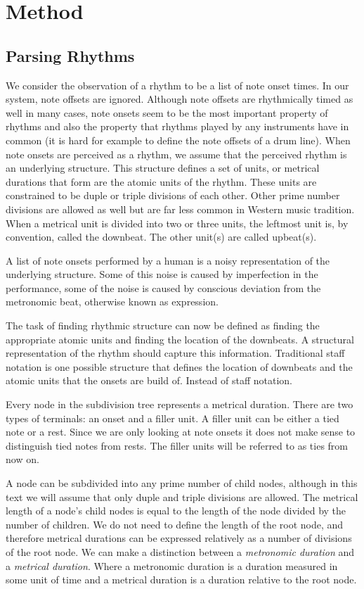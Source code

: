 \section{Method}
\label{sec:method}


\subsection{Parsing Rhythms}

We consider the observation of a rhythm to be a list of note onset times. In our system, note offsets are ignored. Although note offsets are rhythmically timed as well in many cases, note onsets seem to be the most important property of rhythms and also the property that rhythms played by any instruments have in common (it is hard for example to define the note offsets of a drum line). When note onsets are perceived as a rhythm, we assume that the perceived rhythm is an underlying structure. This structure defines a set of units, or metrical durations that form are the atomic units of the rhythm. These units are constrained to be duple or triple divisions of each other. Other prime number divisions are allowed as well but are far less common in Western music tradition. When a metrical unit is divided into two or three units, the leftmost unit is, by convention, called the downbeat. The other unit(s) are called upbeat(s).

A list of note onsets performed by a human is a noisy representation of the underlying structure. Some of this noise is caused by imperfection in the performance, some of the noise is caused by conscious deviation from the metronomic beat, otherwise known as expression.

The task of finding rhythmic structure can now be defined as finding the appropriate atomic units and finding the location of the downbeats. A structural representation of the rhythm should capture this information. Traditional staff notation is one possible structure that defines the location of downbeats and the atomic units that the onsets are build of. Instead of staff notation.

Every node in the subdivision tree represents a metrical duration. There are two types of terminals: an onset and a filler unit. A filler unit can be either a tied note or a rest. Since we are only looking at note onsets it does not make sense to distinguish tied notes from rests. The filler units will be referred to as ties from now on.

A node can be subdivided into any prime number of child nodes, although in this text we will assume that only duple and triple divisions are allowed. The metrical length of a node's child nodes is equal to the length of the node divided by the number of children. We do not need to define the length of the root node, and therefore metrical durations can be expressed relatively as a number of divisions of the root node. We can make a distinction between a \textit{metronomic duration} and a \textit{metrical duration}. Where a metronomic duration is a duration measured in some unit of time and a metrical duration is a duration relative to the root node. 

